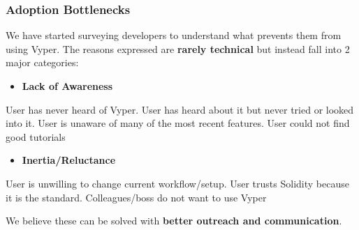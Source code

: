 \documentclass[aspectratio=169]{beamer}
\begin{document}
	\begin{frame}
		\frametitle{Adoption Bottlenecks}
		
		\vspace{0.51em}
		We have started surveying developers to understand what prevents them from using Vyper. The reasons expressed are \textbf{rarely technical} but instead fall into 2 major categories:
		
		\vspace{1em}
		\begin{itemize}
			\item \textbf{Lack of Awareness}
		\end{itemize}
		\vspace{0.5em}
		\hspace{2em}\parbox{0.8\textwidth}{\footnotesize User has never heard of Vyper. User has heard about it but never tried or looked into it. User is unaware of many of the most recent features. User could not find good tutorials}
		
		\vspace{1em}
		\begin{itemize}
			\item \textbf{Inertia/Reluctance}
		\end{itemize}
		\vspace{0.5em}
		\hspace{2em}\parbox{0.8\textwidth}{\footnotesize User is unwilling to change current workflow/setup. User trusts Solidity because it is the standard. Colleagues/boss do not want to use Vyper}
		
		\vspace{1.5em}
		We believe these can be solved with \textbf{better outreach and communication}.
	\end{frame}
	
\end{document}
